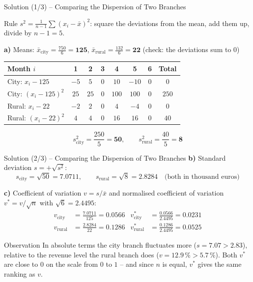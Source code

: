 \documentclass[aspectratio=169,11pt]{beamer}
\begin{document}
\begin{frame}{Solution (1/3) -- Comparing the Dispersion of Two Branches}
  \begin{block}{Rule}
    $s^2 = \frac{1}{n-1}\sum (x_i - \bar{x})^2$: square the deviations from the mean, add them up,
    divide by $n - 1 = 5$.
  \end{block}
  \textbf{a)} Means: $\bar{x}_{\text{city}} = \frac{750}{6} = \mathbf{125}$, \quad
  $\bar{x}_{\text{rural}} = \frac{132}{6} = \mathbf{22}$ \quad (check: the deviations sum to $0$)
  \begin{center}
    \renewcommand{\arraystretch}{1.1}
    \begin{tabular}{lccccccc}
      \toprule
      Month $i$ & 1 & 2 & 3 & 4 & 5 & 6 & Total \\
      \midrule
      City: $x_i - 125$ & $-5$ & $5$ & $0$ & $10$ & $-10$ & $0$ & $0$ \\
      City: $(x_i - 125)^2$ & $25$ & $25$ & $0$ & $100$ & $100$ & $0$ & $250$ \\
      \midrule
      Rural: $x_i - 22$ & $-2$ & $2$ & $0$ & $4$ & $-4$ & $0$ & $0$ \\
      Rural: $(x_i - 22)^2$ & $4$ & $4$ & $0$ & $16$ & $16$ & $0$ & $40$ \\
      \bottomrule
    \end{tabular}
  \end{center}
  \[ s^2_{\text{city}} = \frac{250}{5} = \mathbf{50}, \qquad s^2_{\text{rural}} = \frac{40}{5} = \mathbf{8} \]
\end{frame}

\begin{frame}{Solution (2/3) -- Comparing the Dispersion of Two Branches}
  \textbf{b)} Standard deviation $s = +\sqrt{s^2}$:
  \[ s_{\text{city}} = \sqrt{50} = \mathbf{7.0711}, \qquad s_{\text{rural}} = \sqrt{8} = \mathbf{2.8284}
     \quad \text{(both in thousand euros)} \]

  \textbf{c)} Coefficient of variation $v = s / \bar{x}$ and normalised coefficient of variation
  $v^* = v / \sqrt{n}$ with $\sqrt{6} = 2.4495$:
  \begin{align*}
    v_{\text{city}}  &= \frac{7.0711}{125} = \mathbf{0.0566} & v^*_{\text{city}}  &= \frac{0.0566}{2.4495} = \mathbf{0.0231} \\[4pt]
    v_{\text{rural}} &= \frac{2.8284}{22}  = \mathbf{0.1286} & v^*_{\text{rural}} &= \frac{0.1286}{2.4495} = \mathbf{0.0525}
  \end{align*}

  \begin{alertblock}{Observation}
    In absolute terms the city branch fluctuates more ($s = 7.07 > 2.83$), relative to the revenue
    level the rural branch does ($v = 12.9\,\% > 5.7\,\%$). Both $v^*$ are close to $0$ on the
    scale from $0$ to $1$ -- and since $n$ is equal, $v^*$ gives the same ranking as $v$.
  \end{alertblock}
\end{frame}
\end{document}
